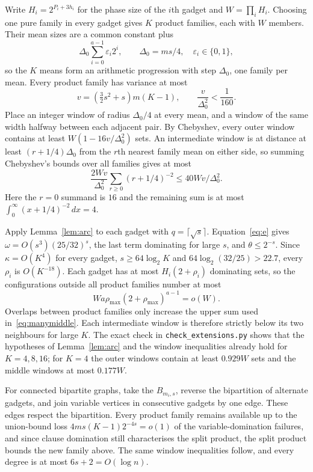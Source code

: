 \documentclass[11pt,a4paper]{article}
\theoremstyle{definition}
\theoremstyle{remark}
\begin{document}
Write $H_i=2^{P_i+3h_i}$ for the phase size of the $i$th gadget and $W=\prod_i H_i$. Choosing one pure family in every gadget gives $K$ product families, each with $W$ members. Their mean sizes are a common constant plus
\[
\Delta_0\sum_{i=0}^{a-1}\varepsilon_i2^i,
\qquad \Delta_0=ms/4,\quad \varepsilon_i\in\{0,1\},
\]
so the $K$ means form an arithmetic progression with step $\Delta_0$, one family per mean. Every product family has variance at most
\[
v=(\tfrac32s^2+s)m(K-1),\qquad
\frac{v}{\Delta_0^2}<\frac1{160}.
\]
Place an integer window of radius $\Delta_0/4$ at every mean, and a window of the same width halfway between each adjacent pair. By Chebyshev, every outer window contains at least $W(1-16v/\Delta_0^2)$ sets. An intermediate window is at distance at least $(r+1/4)\Delta_0$ from the $r$th nearest family mean on either side, so summing Chebyshev's bounds over all families gives at most
\begin{equation}\label{eq:manymiddle}
\frac{2Wv}{\Delta_0^2}\sum_{r\ge0}(r+1/4)^{-2}
\le40Wv/\Delta_0^2 .
\end{equation}
Here the $r=0$ summand is $16$ and the remaining sum is at most $\int_0^\infty(x+1/4)^{-2}\,dx=4$.

Apply Lemma~\ref{lem:arc} to each gadget with $q=\lceil\sqrt s\rceil$. Equation~\eqref{eq:e} gives $\omega=O(s^3)(25/32)^s$, the last term dominating for large $s$, and $\theta\le2^{-s}$. Since $\kappa=O(K^4)$ for every gadget, $s\ge64\log_2K$ and $64\log_2(32/25)>22.7$, every $\rho_i$ is $O(K^{-18})$. Each gadget has at most $H_i(2+\rho_i)$ dominating sets, so the configurations outside all product families number at most
\[
W a\rho_{\max}(2+\rho_{\max})^{a-1}=o(W).
\]
Overlaps between product families only increase the upper sum used in~\eqref{eq:manymiddle}. Each intermediate window is therefore strictly below its two neighbours for large $K$. The exact check in \texttt{check\_extensions.py} shows that the hypotheses of Lemma~\ref{lem:arc} and the window inequalities already hold for $K=4,8,16$; for $K=4$ the outer windows contain at least $0.929W$ sets and the middle windows at most $0.177W$.

For connected bipartite graphs, take the $B_{m_i,s}$, reverse the bipartition of alternate gadgets, and join variable vertices in consecutive gadgets by one edge. These edges respect the bipartition. Every product family remains available up to the union-bound loss $4ms(K-1)2^{-4s}=o(1)$ of the variable-domination failures, and since clause domination still characterises the split product, the split product bounds the new family above. The same window inequalities follow, and every degree is at most $6s+2=O(\log n)$.
\end{document}
